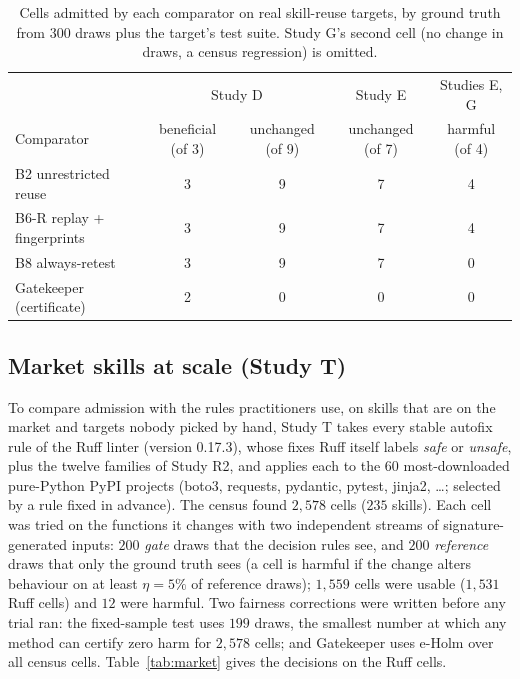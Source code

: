 \begin{table}[t]
\centering\footnotesize
\caption{Cells admitted by each comparator on real skill-reuse targets, by ground truth from $300$ draws plus the target's test
suite.  Study G's second cell (no change in draws, a census regression) is omitted.}
\label{tab:cells}
\begin{tabular}{@{}lcccc@{}}
\toprule
 & \multicolumn{2}{c}{Study D} & Study E & Studies E, G \\
Comparator & beneficial (of 3) & unchanged (of 9) & unchanged (of 7) & harmful (of 4) \\
\midrule
B2 unrestricted reuse          & 3 & 9 & 7 & 4 \\
B6-R replay + fingerprints     & 3 & 9 & 7 & 4 \\
B8 always-retest               & 3 & 9 & 7 & 0 \\
Gatekeeper (certificate)       & 2 & 0 & 0 & 0 \\
\bottomrule
\end{tabular}
\end{table}

\subsection{Market skills at scale (Study T)}
\label{sec:eval-market}
To compare admission with the rules practitioners use, on skills that are on the market and targets nobody picked by hand, Study T
takes every stable autofix rule of the Ruff linter (version 0.17.3), whose fixes Ruff itself labels \emph{safe} or \emph{unsafe},
plus the twelve families of Study R2, and applies each to the $60$ most-downloaded pure-Python PyPI projects (boto3, requests,
pydantic, pytest, jinja2, \dots; selected by a rule fixed in advance).  The census found $2{,}578$ cells ($235$ skills).  Each cell was
tried on the functions it changes with two independent streams of signature-generated inputs: $200$ \emph{gate} draws that the
decision rules see, and $200$ \emph{reference} draws that only the ground truth sees (a cell is harmful if the change alters
behaviour on at least $\eta=5\%$ of reference draws); $1{,}559$ cells were usable ($1{,}531$ Ruff cells) and $12$ were harmful.  Two
fairness corrections were written before any trial ran: the fixed-sample test uses $199$ draws, the smallest number at which any
method can certify zero harm for $2{,}578$ cells; and Gatekeeper uses e-Holm over all census cells.  Table~\ref{tab:market} gives the
decisions on the Ruff cells.

